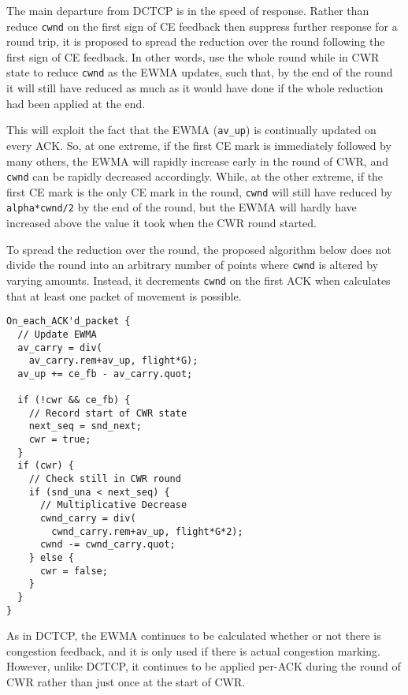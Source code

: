 The main departure from DCTCP is in the speed of response. Rather than reduce 
\texttt{cwnd} on the first sign of CE feedback then suppress further response
for a round trip, it is proposed to spread the reduction over the round
following the first sign of CE feedback. In other words, use the whole round
while in CWR state to reduce \texttt{cwnd} as the EWMA updates, such that, by
the end of the round it will still have reduced as much as it would have done if
the whole reduction had been applied at the end. 

This will exploit the fact that the EWMA (\texttt{av\_up}) is continually
updated on every ACK. So, at one extreme, if the first CE mark is immediately
followed by many others, the EWMA will rapidly increase early in the round of
CWR, and \texttt{cwnd} can be rapidly decreased accordingly. While, at the other
extreme, if the first CE mark is the only CE mark in the round, \texttt{cwnd}
will still have reduced by \texttt{alpha*cwnd/2} by the end of the round, but
the EWMA will hardly have increased above the value it took when the CWR round
started. 

To spread the reduction over the round, the proposed algorithm below does not
divide the round into an arbitrary number of points where \texttt{cwnd} is
altered by varying amounts. Instead, it decrements \texttt{cwnd} on the first ACK
when calculates that at least one packet of movement is possible. 

\begin{verbatim}
On_each_ACK'd_packet {
  // Update EWMA
  av_carry = div(
    av_carry.rem+av_up, flight*G);
  av_up += ce_fb - av_carry.quot;

  if (!cwr && ce_fb) {
    // Record start of CWR state
    next_seq = snd_next;
    cwr = true;
  }
  if (cwr) {
    // Check still in CWR round
    if (snd_una < next_seq) {
      // Multiplicative Decrease
      cwnd_carry = div(
        cwnd_carry.rem+av_up, flight*G*2);
      cwnd -= cwnd_carry.quot;
    } else {
      cwr = false;
    }
  }
}
\end{verbatim}

As in DCTCP, the EWMA continues to be calculated whether or not there is
congestion feedback, and it is only used if there
is actual congestion marking. However, unlike DCTCP, it continues to be applied
per-ACK during the round of CWR rather than just once at the start of CWR. 

